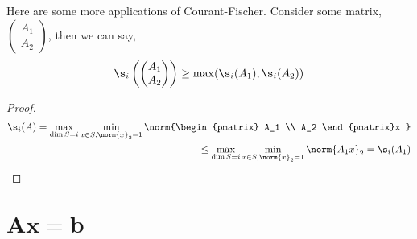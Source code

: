 
\noindent
Here are some more applications of Courant-Fischer. Consider some matrix, $\begin{pmatrix}
  A_1 \\ A_2
\end{pmatrix}$, then we can say,
$$ \s_i \left( \begin{pmatrix}
  A_1 \\ A_2
\end{pmatrix} \right) \ge \max(\s_i(A_1), \s_i(A_2)) $$
\begin{proof}
  \begin{align*}
    \s_i(A) = \max_{\dim S = i}\min_{x \in S, \norm{x}_2 = 1} \norm{\begin{pmatrix}
      A_1 \\ A_2
  \end{pmatrix}x } \\
  \le  \max_{\dim S = i}\min_{x \in S, \norm{x}_2 = 1}\norm{A_1x}_2 = \s_i(A_1)
  \end{align*}
\end{proof}

\section{$\mathbf{Ax = b}$}
